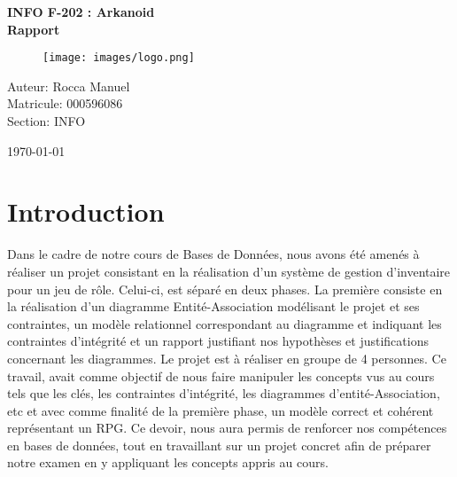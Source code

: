 \documentclass[utf8]{article}
\begin{document}
\begin{titlepage}
    \centering
    
    \vspace*{1cm}
    {\huge \bfseries INFO F-202 : Arkanoid\\
                    Rapport \par}
    
    \vfill
    
    \begin{figure}[h]
        \centering
        \texttt{[image: images/logo.png]}
    \end{figure}
    
    \vfill
    
    {\large Auteur: Rocca Manuel\\ 
            Matricule: 000596086 \\ 
            Section: INFO \par}
    {\large \today \par}
\end{titlepage}

\newpage
\tableofcontents

\newpage


\section{Introduction}
Dans le cadre de notre cours de Bases de Données, nous avons été amenés à réaliser un projet consistant en
la réalisation d’un système de gestion d’inventaire pour un jeu de rôle. Celui-ci, est séparé en deux phases.
La première consiste en la réalisation d’un diagramme Entité-Association modélisant le projet et ses contraintes, 
un modèle relationnel correspondant au diagramme et indiquant les contraintes d’intégrité et un rapport 
justifiant nos hypothèses et justifications concernant les diagrammes.
Le projet est à réaliser en groupe de 4 personnes. Ce travail, avait comme objectif de
nous faire manipuler les concepts vus au cours tels que les clés, les contraintes d’intégrité, 
les diagrammes d'entité-Association, etc et avec comme finalité de la première phase, un modèle correct 
et cohérent représentant un RPG.
Ce devoir, nous aura permis de renforcer nos compétences en bases de données, tout en travaillant sur un projet concret
afin de préparer notre examen en y appliquant les concepts appris au cours.
\end{document}
